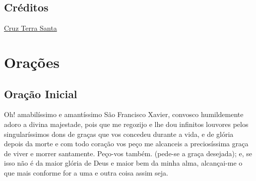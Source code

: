 \documentclass[11pt]{article}
\begin{document}
\subsection{Créditos }
\href{https://cruzterrasanta.com.br/historia-de-sao-francisco-xavier/141/102/}{Cruz Terra Santa}

\newpage
\section{Orações}\label{oracoes}


\subsection{Oração Inicial}

Oh! amabilíssimo e amantíssimo São Francisco Xavier, convosco
humildemente adoro a divina majestade, pois que me regozijo e lhe dou
infinitos louvores pelos singularíssimos dons de graças que vos concedeu
durante a vida, e de glória depois da morte e com todo coração vos peço
me alcanceis a preciosíssima graça de viver e morrer santamente.
Peço-vos também. (pede-se a graça desejada); e, se isso não é da maior
glória de Deus e maior bem da minha alma, alcançai-me o que mais
conforme for a uma e outra coisa assim seja.
\end{document}
